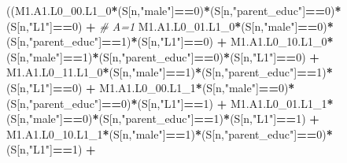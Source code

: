 \documentclass[
]{book}
\newenvironment{Shaded}{\begin{snugshade}}{\end{snugshade}}
\newcommand{\CommentTok}[1]{\textcolor[rgb]{0.56,0.35,0.01}{\textit{#1}}}
\newcommand{\DecValTok}[1]{\textcolor[rgb]{0.00,0.00,0.81}{#1}}
\newcommand{\NormalTok}[1]{#1}
\newcommand{\SpecialCharTok}[1]{\textcolor[rgb]{0.81,0.36,0.00}{\textbf{#1}}}
\newcommand{\StringTok}[1]{\textcolor[rgb]{0.31,0.60,0.02}{#1}}
\begin{document}
\begin{Shaded}
\begin{Highlighting}[]
\NormalTok{      ((M1.A1.L0\_00.L1\_0}\SpecialCharTok{*}\NormalTok{(S[n,}\StringTok{"male"}\NormalTok{]}\SpecialCharTok{==}\DecValTok{0}\NormalTok{)}\SpecialCharTok{*}\NormalTok{(S[n,}\StringTok{"parent\_educ"}\NormalTok{]}\SpecialCharTok{==}\DecValTok{0}\NormalTok{)}\SpecialCharTok{*}\NormalTok{(S[n,}\StringTok{"L1"}\NormalTok{]}\SpecialCharTok{==}\DecValTok{0}\NormalTok{) }\SpecialCharTok{+} \CommentTok{\# A\textquotesingle{}=1}
\NormalTok{          M1.A1.L0\_01.L1\_0}\SpecialCharTok{*}\NormalTok{(S[n,}\StringTok{"male"}\NormalTok{]}\SpecialCharTok{==}\DecValTok{0}\NormalTok{)}\SpecialCharTok{*}\NormalTok{(S[n,}\StringTok{"parent\_educ"}\NormalTok{]}\SpecialCharTok{==}\DecValTok{1}\NormalTok{)}\SpecialCharTok{*}\NormalTok{(S[n,}\StringTok{"L1"}\NormalTok{]}\SpecialCharTok{==}\DecValTok{0}\NormalTok{) }\SpecialCharTok{+}
\NormalTok{          M1.A1.L0\_10.L1\_0}\SpecialCharTok{*}\NormalTok{(S[n,}\StringTok{"male"}\NormalTok{]}\SpecialCharTok{==}\DecValTok{1}\NormalTok{)}\SpecialCharTok{*}\NormalTok{(S[n,}\StringTok{"parent\_educ"}\NormalTok{]}\SpecialCharTok{==}\DecValTok{0}\NormalTok{)}\SpecialCharTok{*}\NormalTok{(S[n,}\StringTok{"L1"}\NormalTok{]}\SpecialCharTok{==}\DecValTok{0}\NormalTok{) }\SpecialCharTok{+} 
\NormalTok{          M1.A1.L0\_11.L1\_0}\SpecialCharTok{*}\NormalTok{(S[n,}\StringTok{"male"}\NormalTok{]}\SpecialCharTok{==}\DecValTok{1}\NormalTok{)}\SpecialCharTok{*}\NormalTok{(S[n,}\StringTok{"parent\_educ"}\NormalTok{]}\SpecialCharTok{==}\DecValTok{1}\NormalTok{)}\SpecialCharTok{*}\NormalTok{(S[n,}\StringTok{"L1"}\NormalTok{]}\SpecialCharTok{==}\DecValTok{0}\NormalTok{) }\SpecialCharTok{+}
\NormalTok{          M1.A1.L0\_00.L1\_1}\SpecialCharTok{*}\NormalTok{(S[n,}\StringTok{"male"}\NormalTok{]}\SpecialCharTok{==}\DecValTok{0}\NormalTok{)}\SpecialCharTok{*}\NormalTok{(S[n,}\StringTok{"parent\_educ"}\NormalTok{]}\SpecialCharTok{==}\DecValTok{0}\NormalTok{)}\SpecialCharTok{*}\NormalTok{(S[n,}\StringTok{"L1"}\NormalTok{]}\SpecialCharTok{==}\DecValTok{1}\NormalTok{) }\SpecialCharTok{+}
\NormalTok{          M1.A1.L0\_01.L1\_1}\SpecialCharTok{*}\NormalTok{(S[n,}\StringTok{"male"}\NormalTok{]}\SpecialCharTok{==}\DecValTok{0}\NormalTok{)}\SpecialCharTok{*}\NormalTok{(S[n,}\StringTok{"parent\_educ"}\NormalTok{]}\SpecialCharTok{==}\DecValTok{1}\NormalTok{)}\SpecialCharTok{*}\NormalTok{(S[n,}\StringTok{"L1"}\NormalTok{]}\SpecialCharTok{==}\DecValTok{1}\NormalTok{) }\SpecialCharTok{+}
\NormalTok{          M1.A1.L0\_10.L1\_1}\SpecialCharTok{*}\NormalTok{(S[n,}\StringTok{"male"}\NormalTok{]}\SpecialCharTok{==}\DecValTok{1}\NormalTok{)}\SpecialCharTok{*}\NormalTok{(S[n,}\StringTok{"parent\_educ"}\NormalTok{]}\SpecialCharTok{==}\DecValTok{0}\NormalTok{)}\SpecialCharTok{*}\NormalTok{(S[n,}\StringTok{"L1"}\NormalTok{]}\SpecialCharTok{==}\DecValTok{1}\NormalTok{) }\SpecialCharTok{+}

\end{Highlighting}
\end{Shaded}
\end{document}
